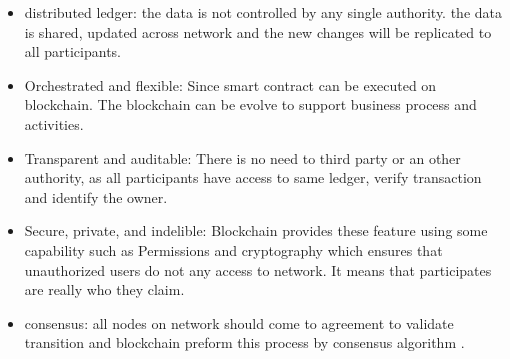 \begin{itemize}
    \item distributed ledger: the data is not controlled by any single authority. the data is shared, updated across network and the new changes will be replicated to all participants.
    \item Orchestrated and flexible: Since smart contract can be executed on blockchain. The blockchain can be evolve to support business process and activities.
    \item Transparent and auditable: There is no need to third party or an other authority, as all participants have access to same ledger, verify transaction and identify the owner. 
    \item Secure, private, and indelible:
    Blockchain provides these feature using some capability such as Permissions and cryptography which ensures that  
    unauthorized users do not any access to network. It means that participates are really who they claim.
    \item consensus: all nodes on network should come to agreement to validate transition and blockchain preform this process by consensus algorithm \cite{Gupta}.
\end{itemize}

